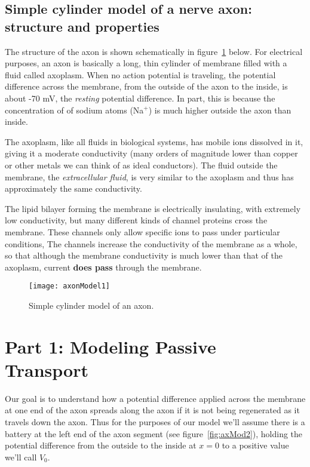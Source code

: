 \subsection*{Simple cylinder model of a nerve axon: structure and properties}


The structure of the axon is shown schematically in figure~\ref{fig:axMod1} below.
For electrical purposes, an axon is basically a long, thin cylinder of membrane filled with a fluid called axoplasm.
When no action potential is traveling, the potential difference across the membrane, from the outside of the axon to the inside, is about -70 mV, the \emph{resting} potential difference.
In part, this is because the concentration of of sodium atoms (Na$^{+}$) is much higher outside the axon than inside.
\par
The axoplasm, like all fluids in biological systems, has mobile ions dissolved in it, giving it a moderate conductivity (many orders of magnitude lower than copper or other metals we can think of as ideal conductors).
The fluid outside the membrane, the \emph{extracellular fluid}, is very similar to the axoplasm and thus has approximately the same conductivity.
\par 
The lipid bilayer forming the membrane is electrically insulating, with extremely low conductivity, but many different kinds of channel proteins cross the membrane.
These channels only allow specific ions to pass under particular conditions,
The channels increase the conductivity of the membrane as a whole, so that although the membrane conductivity is much lower than that of the axoplasm, current \textbf{does pass} through the membrane.

\begin{figure}[hbtp]
	\centering
	\texttt{[image: axonModel1]}
	\caption{Simple cylinder model of an axon.}
	\label{fig:axMod1}
	\vspace{-20pt}
\end{figure}

\section*{Part 1: Modeling Passive Transport}
Our goal is to understand how a potential difference applied across the membrane at one end of the axon spreads along the axon if it is not being regenerated as it travels down the axon.
Thus for the purposes of our model we'll assume there is a battery at the left end of the axon segment (see figure~\ref{fig:axMod2}), holding the potential difference from the outside to the inside at $x=0$ to a positive value we'll call $V_{0}$.

